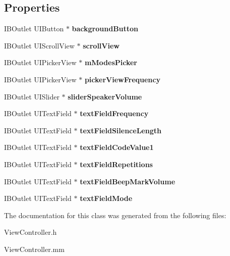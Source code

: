 \subsection*{Properties}
\begin{DoxyCompactItemize}
\item 
\mbox{\label{interface_view_controller_a658045907f0a46585f030bd3917647aa}} 
I\+B\+Outlet U\+I\+Button $\ast$ {\bfseries background\+Button}
\item 
\mbox{\label{interface_view_controller_ab5cab3313406bf6a8df75069d7882f83}} 
I\+B\+Outlet U\+I\+Scroll\+View $\ast$ {\bfseries scroll\+View}
\item 
\mbox{\label{interface_view_controller_aa7241ff6148bdd575c52562c478bbb3a}} 
I\+B\+Outlet U\+I\+Picker\+View $\ast$ {\bfseries m\+Modes\+Picker}
\item 
\mbox{\label{interface_view_controller_a7401ac0ce86a2e7fddde9670289fb464}} 
I\+B\+Outlet U\+I\+Picker\+View $\ast$ {\bfseries picker\+View\+Frequency}
\item 
\mbox{\label{interface_view_controller_acaca00ae6443167be2e39fb354d994d1}} 
I\+B\+Outlet U\+I\+Slider $\ast$ {\bfseries slider\+Speaker\+Volume}
\item 
\mbox{\label{interface_view_controller_a3235938877df5d68815d024b4fe21dda}} 
I\+B\+Outlet U\+I\+Text\+Field $\ast$ {\bfseries text\+Field\+Frequency}
\item 
\mbox{\label{interface_view_controller_a8f1578901abd9346b8efb773d98c8e49}} 
I\+B\+Outlet U\+I\+Text\+Field $\ast$ {\bfseries text\+Field\+Silence\+Length}
\item 
\mbox{\label{interface_view_controller_a6dee8135217f36768cebea5a811d8d8d}} 
I\+B\+Outlet U\+I\+Text\+Field $\ast$ {\bfseries text\+Field\+Code\+Value1}
\item 
\mbox{\label{interface_view_controller_a080747fe7745595bb7ae2eb7d12e4b0a}} 
I\+B\+Outlet U\+I\+Text\+Field $\ast$ {\bfseries text\+Field\+Repetitions}
\item 
\mbox{\label{interface_view_controller_a4b23b290032fb1c804c327a60494c129}} 
I\+B\+Outlet U\+I\+Text\+Field $\ast$ {\bfseries text\+Field\+Beep\+Mark\+Volume}
\item 
\mbox{\label{interface_view_controller_aae24f60d8ca8184fd18aad8785f4d5ad}} 
I\+B\+Outlet U\+I\+Text\+Field $\ast$ {\bfseries text\+Field\+Mode}
\end{DoxyCompactItemize}


The documentation for this class was generated from the following files\+:\begin{DoxyCompactItemize}
\item 
View\+Controller.\+h\item 
View\+Controller.\+mm\end{DoxyCompactItemize}
